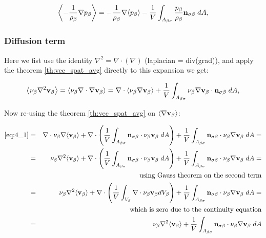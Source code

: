 \begin{equation}
{\left< -\dfrac{1}{\rho_{\beta}} \nabla p_{\beta}\right>} = -\dfrac{1}{\rho_{\beta}} \nabla {\left< p_{\beta}\right>} -\dfrac{1}{V} \int_{A_{\beta \sigma}} \dfrac{p_{\beta}}{\rho_{\beta}} \mathbf{n}_{\sigma \beta} \;dA,
\end{equation}

\subsubsection{Diffusion term}
Here we fist use the identity $\nabla^2 = \nabla \cdot (\nabla)$ (laplacian = div(grad)), and apply the theorem \ref{th:vec_spat_avg} directly to this expansion we get:

\begin{equation}
{\left< \nu_{\beta}\nabla^2 \textbf{v}_{\beta}\right>} = {\left< \nu_{\beta}\nabla \cdot \nabla \textbf{v}_{\beta} \right>} = \nabla \cdot {\left< \nu_{\beta}\nabla \textbf{v}_{\beta}\right>} +\dfrac{1}{V} \int_{A_{\beta \sigma}}  \nu_{\beta} \nabla \textbf{v}_{\beta} \cdot \mathbf{n}_{\sigma \beta} \;dA,
\label{eq:4_1}
\end{equation}

Now re-using the theorem \ref{th:vec_spat_avg} on ${\left< \nabla \textbf{v}_{\beta} \right>}$:

\begin{eqnarray}
	\eqref{eq:4_1} &=& \nabla \cdot \nu_{\beta} \nabla {\left< \textbf{v}_{\beta}\right>} + \nabla \cdot \left( \dfrac{1}{V} \int_{A_{\beta \sigma}} \mathbf{n}_{\sigma \beta} \cdot \nu_{\beta} \textbf{v}_{\beta} \;dA \right) + \dfrac{1}{V} \int_{A_{\beta \sigma}} \mathbf{n}_{\sigma \beta} \cdot \nu_{\beta} \nabla \textbf{v}_{\beta} \;dA = \nonumber \\
	&=& \nu_{\beta}\nabla^2 {\left< \textbf{v}_{\beta} \right>} +  \nabla \cdot \left( \dfrac{1}{V} \int_{A_{\beta \sigma}} \mathbf{n}_{\sigma \beta} \cdot \nu_{\beta} \textbf{v}_{\beta} \;dA \right) + \dfrac{1}{V} \int_{A_{\beta \sigma}} \mathbf{n}_{\sigma \beta} \cdot \nu_{\beta} \nabla \textbf{v}_{\beta} \;dA  = \nonumber \\
	&& \text{using Gauss theorem on the second term} \nonumber \\
	&=& \nu_{\beta}\nabla^2 {\left< \textbf{v}_{\beta} \right>} +  \nabla \cdot \left( \dfrac{1}{V} \int_{V_\beta} \nabla \cdot \nu_{\beta} \textbf{v}_{\beta} dV_\beta \right) + \dfrac{1}{V} \int_{A_{\beta \sigma}} \mathbf{n}_{\sigma \beta} \cdot \nu_{\beta} \nabla \textbf{v}_{\beta} \;dA = \nonumber \\
	&& \text{which is zero due to the continuity equation} \nonumber \\
	&=& \nu_{\beta}\nabla^2 {\left< \textbf{v}_{\beta} \right>} + \dfrac{1}{V} \int_{A_{\beta \sigma}} \mathbf{n}_{\sigma \beta} \cdot \nu_{\beta} \nabla \textbf{v}_{\beta} \;dA
\end{eqnarray}


